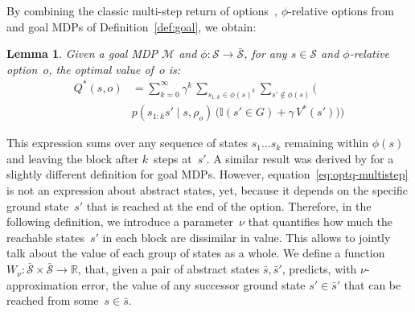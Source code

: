 \documentclass[letterpaper]{article} %
\theoremstyle{plain}
\newtheorem{lemma}{Lemma}
\theoremstyle{definition}
\theoremstyle{remark}
\newcommand{\Reals}{\mathbb{R}}
\newcommand{\Given}{\mid}
\newcommand{\Indicator}{\mathbb{I}}
\newcommand{\SetSym}[1]{\mathcal{#1}}
\newcommand{\Policy}{\rho}
\newcommand{\States}{\SetSym{S}}
\newcommand{\Model}{\SetSym{M}}
\newcommand{\Mapping}{\phi}
\newcommand{\Abst}[1]{\bar{#1}}
\newcommand{\PHomogeneity}{\nu}
\begin{document}
By combining the classic multi-step return of options~\cite{sutton1999between},
$\Mapping$-relative options from~\cite{abel_2020_ValuePreserving} and goal
MDPs of Definition~\ref{def:goal}, we obtain:
\begin{lemma}
Given a goal MDP $\Model$ and $\Mapping: \States \to \Abst\States$,
for any $s \in \States$ and $\Mapping$-relative option~$o$, the optimal value of~$o$ is:
\begin{equation}
\begin{aligned}
Q^*(s, o) &=
\sum_{k=0}^{\infty} \gamma^k\, \sum_{s_{1:k} \in \Mapping(s)^k} \sum_{s' \not\in \Mapping(s)} \bigl(\\
&p(s_{1:k} s' \Given s, \Policy_o)\, \bigl( \Indicator(s' \in G) + \gamma\, V^*(s') \bigr)\bigr)
\end{aligned}
\label{eq:optq-multistep}
\end{equation}
\label{lem:multi-step}
\end{lemma}
This expression sums over any sequence of states ${s_1\dots s_k}$ remaining within $\Mapping(s)$ and leaving the block after $k$~steps at~$s'$.
A similar result was derived by \cite{abel_2020_ValuePreserving} for a slightly different definition for goal MDPs.
However, equation~\eqref{eq:optq-multistep} is not an expression about abstract states, yet, because it depends on the specific ground state~$s'$ that is reached at the end of the option.
Therefore, in the following definition, we introduce a parameter~$\PHomogeneity$ that quantifies how much the reachable states~$s'$ in each block are dissimilar in value.
This allows to jointly talk about the value of each group of states as a whole.
We define a function $W_\PHomogeneity: \Abst\States \times \Abst\States \to \Reals$, that, given a pair of abstract states $\Abst{s}, \Abst{s}'$, predicts, with $\PHomogeneity$-approximation error, the value of any successor ground state $s' \in \Abst{s}'$ that can be reached from some~$s \in \Abst{s}$.
\end{document}
